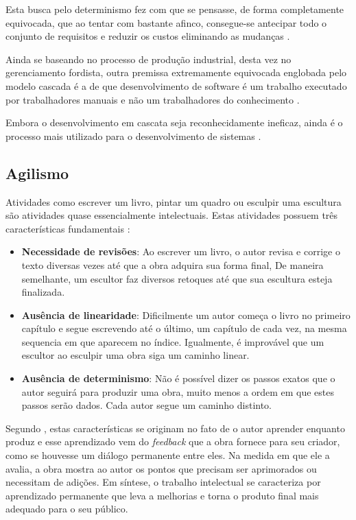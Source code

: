 Esta busca pelo determinismo fez com que se pensasse, de forma completamente equivocada, que ao tentar com bastante afinco, consegue-se antecipar todo o conjunto de requisitos e reduzir os custos eliminando as mudanças \cite{TheBusinessOfInnovation}.

Ainda se baseando no processo de produção industrial, desta vez no gerenciamento fordista, outra premissa extremamente equivocada englobada pelo modelo cascada é a de que desenvolvimento de software é um trabalho executado por trabalhadores manuais e não um trabalhadores do conhecimento \cite[38]{XPTeles}.

Embora o desenvolvimento em cascata seja reconhecidamente ineficaz, ainda é o processo mais utilizado para o desenvolvimento de sistemas \cite{XPTeles}.



\subsection{Agilismo} %
\label{sub:agilismo}

Atividades como escrever um livro, pintar um quadro ou esculpir uma escultura são atividades quase essencialmente intelectuais. Estas atividades possuem três características fundamentais \cite{XPTeles}:

\begin{itemize}
  \item \textbf{Necessidade de revisões}: Ao escrever um livro, o autor revisa e corrige o texto diversas vezes até que a obra adquira sua forma final, De maneira semelhante, um escultor faz diversos retoques até que sua escultura esteja finalizada.
  \item \textbf{Ausência de linearidade}: Dificilmente um autor começa o livro no primeiro capítulo e segue escrevendo até o último, um capítulo de cada vez, na mesma sequencia em que aparecem no índice. Igualmente, é improvável que um escultor ao esculpir uma obra siga um caminho linear.
  \item \textbf{Ausência de determinismo}: Não é possível dizer os passos exatos que o autor seguirá para produzir uma obra, muito menos a ordem em que estes passos serão dados. Cada autor segue um caminho distinto.
\end{itemize}

Segundo , estas características se originam no fato de o autor aprender enquanto produz e esse aprendizado vem do \textit{feedback} que a obra fornece para seu criador, como se houvesse um diálogo permanente entre eles. Na medida em que ele a avalia, a obra mostra ao autor os pontos que precisam ser aprimorados ou necessitam de adições. Em síntese, o trabalho intelectual se caracteriza por aprendizado  permanente que leva a melhorias e torna o produto final mais adequado para o seu público.

